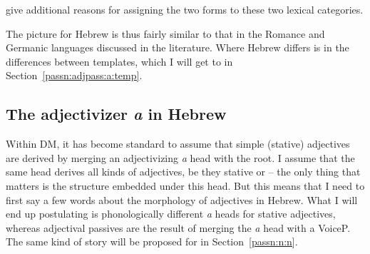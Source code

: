 \begin{exe}
\begin{xlist}
\begin{exe}
\begin{xlist}
\begin{exe}
\begin{exe}
\begin{xlist}
\begin{exe}
\begin{exe}
\begin{xlist}
\begin{exe}
\begin{xlist}
\begin{exe}
\begin{xlist}
\begin{exe}
\begin{xlist}
\begin{exe}
\begin{xlist}
\begin{xlist}
\begin{exe}
\begin{xlist}
\begin{exe}
\begin{xlist}
\begin{exe}
\begin{exe}
\begin{exe}
\begin{xlist}
\begin{exe}
\begin{exe}
\begin{xlist}
\begin{exe}
\begin{xlist}
\begin{exe}
\begin{xlist}
\begin{exe}
\begin{xlist}
\begin{xlist}
\begin{exe}
\begin{xlist}
\begin{exe}
\begin{xlist}
\begin{exe}
\begin{xlist}
\begin{exe}
\begin{xlist}
		
 \z
\z 
\cite{horvathsiloni08} give additional reasons for assigning the two forms to these two lexical categories.

The picture for Hebrew is thus fairly similar to that in the Romance and Germanic languages discussed in the literature. Where Hebrew differs is in the differences between templates, which I will get to in Section~\ref{passn:adjpass:a:temp}.

	\subsection{The adjectivizer \emph{a} in Hebrew} \label{passn:adjpass:a}
Within DM, it has become standard to assume that simple (stative) adjectives are derived by merging an adjectivizing \emph{a} head with the root. I assume that the same head derives all kinds of adjectives, be they stative or  -- the only thing that matters is the structure embedded under this head. But this means that I need to first say a few words about the morphology of adjectives in Hebrew. What I will end up postulating is phonologically different \emph{a} heads for stative adjectives, whereas adjectival passives are the result of merging the \emph{a} head with a VoiceP. The same kind of story will be proposed for  in Section~\ref{passn:n:n}.


\end{xlist}
\end{exe}
\end{xlist}
\end{exe}
\end{xlist}
\end{exe}
\end{xlist}
\end{exe}
\end{xlist}
\end{xlist}
\end{exe}
\end{xlist}
\end{exe}
\end{xlist}
\end{exe}
\end{xlist}
\end{exe}
\end{exe}
\end{xlist}
\end{exe}
\end{exe}
\end{exe}
\end{xlist}
\end{exe}
\end{xlist}
\end{exe}
\end{xlist}
\end{xlist}
\end{exe}
\end{xlist}
\end{exe}
\end{xlist}
\end{exe}
\end{xlist}
\end{exe}
\end{xlist}
\end{exe}
\end{exe}
\end{xlist}
\end{exe}
\end{exe}
\end{xlist}
\end{exe}
\end{xlist}
\end{exe}
